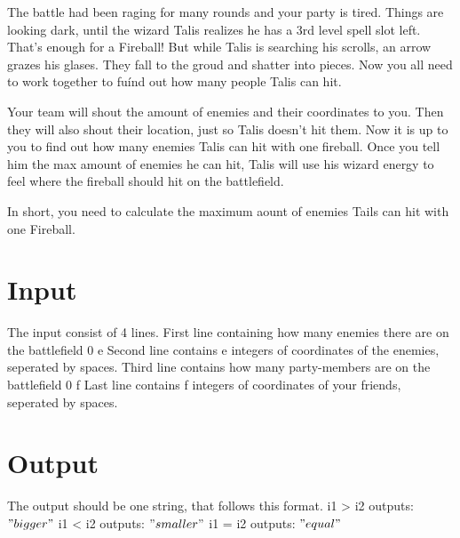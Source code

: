 
The battle had been raging for many rounds and your party is tired. Things are looking dark, until the wizard Talis realizes he has a 3rd level spell slot left. 
That's enough for a Fireball! But while Talis is searching his scrolls, an arrow grazes his glases. They fall to the groud and shatter into pieces. Now you all need
to work together to fuínd out how many people Talis can hit. 

Your team will shout the amount of enemies and their coordinates to you. Then they will also shout their location, just so Talis doesn't hit them. Now it is up to you to find out how many enemies Talis can hit with one fireball. Once you tell him the max amount of enemies he can hit, Talis will use his wizard energy to feel where
the fireball should hit on the battlefield. 

In short, you need to calculate the maximum aount of enemies Tails can hit with one Fireball.

\section*{Input}

The input consist of 4 lines. 
First line containing how many enemies there are on the battlefield 0 \leq e 
Second line contains e integers of coordinates of the enemies, seperated by spaces.
Third line contains how many party-members are on the battlefield 0 \leq f 
Last line contains f integers of coordinates of your friends, seperated by spaces.

\section*{Output}

The output should be one string, that follows this format.
i1 > i2 outputs: $"bigger"$
i1 < i2 outputs: $"smaller"$ 
i1 = i2 outputs: $"equal"$

